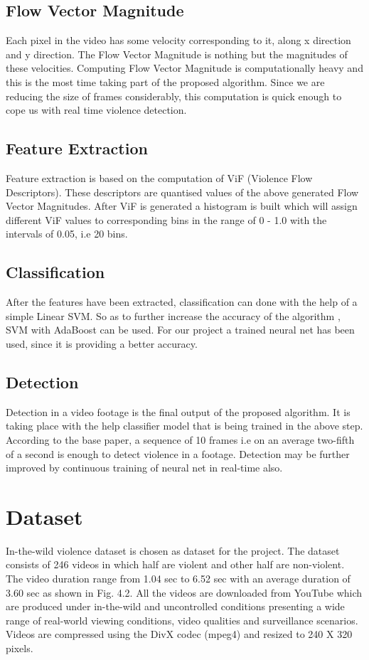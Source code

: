 \subsection{Flow Vector Magnitude}
Each pixel in the video has some velocity corresponding to it, along x direction and y direction. The Flow Vector Magnitude is nothing but the magnitudes of these velocities. Computing Flow Vector Magnitude is computationally heavy and this is the most time taking part of the proposed algorithm. Since we are reducing the size of frames considerably, this computation is quick enough to cope us with real time violence detection.
\subsection{Feature Extraction}
Feature extraction is based on the computation of ViF (Violence Flow Descriptors). These descriptors are quantised values of the above generated Flow Vector Magnitudes. After ViF is generated a histogram is built which will assign different ViF values to corresponding bins in the range of 0 - 1.0 with the intervals of 0.05, i.e 20 bins.
\subsection{Classification}
After the features have been extracted, classification can done with the help of a simple Linear SVM. So as to further increase the accuracy of the algorithm , SVM with AdaBoost can be used. For our project a trained neural net has been used, since it is providing a better accuracy.
\subsection{Detection}
Detection in a video footage is the final output of the proposed algorithm. It is taking place with the help classifier model that is being trained in the above step. According to the base paper, a sequence of 10 frames i.e on an average two-fifth of a second is enough to detect violence in a footage. Detection may be further improved by continuous training of neural net in real-time also.
\section{Dataset}
In-the-wild violence dataset is chosen as dataset for the project. The dataset consists of 246 videos in which half are violent and other half are non-violent. The video duration range from 1.04 sec to 6.52 sec with an average duration of 3.60 sec as shown in Fig. 4.2. All the videos are downloaded from YouTube which are produced under in-the-wild and uncontrolled conditions presenting a wide range of real-world viewing conditions, video qualities and surveillance scenarios. Videos are compressed using the DivX codec (mpeg4) and resized to 240 X 320 pixels.

